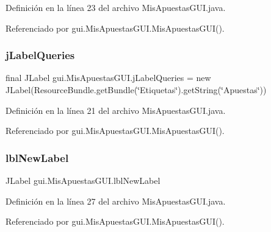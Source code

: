Definición en la línea 23 del archivo Mis\+Apuestas\+G\+U\+I.\+java.



Referenciado por gui.\+Mis\+Apuestas\+G\+U\+I.\+Mis\+Apuestas\+G\+U\+I().

\mbox{\label{classgui_1_1MisApuestasGUI_a4260727efd46f4e5d89996b20f985db9}} 
\subsubsection{\texorpdfstring{jLabelQueries}{jLabelQueries}}
{\footnotesize\ttfamily final J\+Label gui.\+Mis\+Apuestas\+G\+U\+I.\+j\+Label\+Queries = new J\+Label(Resource\+Bundle.\+get\+Bundle(\char`\"{}Etiquetas\char`\"{}).get\+String(\char`\"{}Apuestas\char`\"{}))\hspace{0.3cm}{\ttfamily [private]}}



Definición en la línea 21 del archivo Mis\+Apuestas\+G\+U\+I.\+java.



Referenciado por gui.\+Mis\+Apuestas\+G\+U\+I.\+Mis\+Apuestas\+G\+U\+I().

\mbox{\label{classgui_1_1MisApuestasGUI_a4639e119f80cd3a6f348340e81edfca2}} 
\subsubsection{\texorpdfstring{lblNewLabel}{lblNewLabel}}
{\footnotesize\ttfamily J\+Label gui.\+Mis\+Apuestas\+G\+U\+I.\+lbl\+New\+Label\hspace{0.3cm}{\ttfamily [private]}}



Definición en la línea 27 del archivo Mis\+Apuestas\+G\+U\+I.\+java.



Referenciado por gui.\+Mis\+Apuestas\+G\+U\+I.\+Mis\+Apuestas\+G\+U\+I().

\mbox{\label{classgui_1_1MisApuestasGUI_a3a53904c8f32e79970c451babb341c0f}} 

